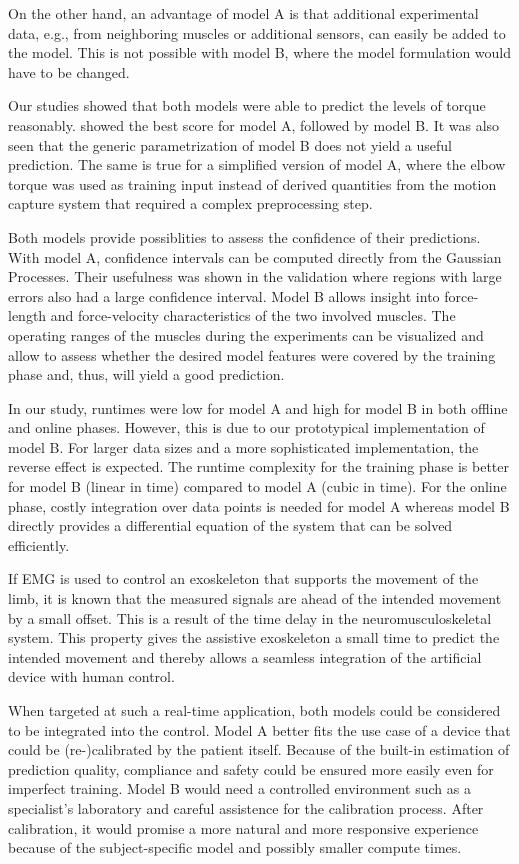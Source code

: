 On the other hand, an advantage of model A is that additional experimental data, e.g., from neighboring muscles or additional sensors, can easily be added to the model. This is not possible with model B, where the model formulation would have to be changed.

Our studies showed that both models were able to predict the levels of torque reasonably. 
 showed the best score for model A, followed by model B. It was also seen that the generic parametrization of model B does not yield a useful prediction. The same is true for a simplified version of model A, where the elbow torque was used as training input instead of derived quantities from the motion capture system that required a complex preprocessing step.

Both models provide possiblities to assess the confidence of their predictions. With model A, confidence intervals can be computed directly from the Gaussian Processes. Their usefulness was shown in the validation where regions with large errors also had a large confidence interval. 
Model B allows insight into force-length and force-velocity characteristics of the two involved muscles. The operating ranges of the muscles during the experiments can be visualized and allow to assess whether the desired model features were covered by the training phase and, thus, will yield a good prediction.

In our study, runtimes were low for model A and high for model B in both offline and online phases. However, this is due to our prototypical implementation of model B. For larger data sizes and a more sophisticated implementation, the reverse effect is expected. The runtime complexity for the training phase is better for model B (linear in time) compared to model A (cubic in time). For the online phase, costly integration over data points is needed for model A whereas model B directly provides a differential equation of the system that can be solved efficiently. 

If EMG is used to control an exoskeleton that supports the movement of the limb, it is known that the measured signals are ahead of the intended movement by a small offset. This is a result of the time delay in the neuromusculoskeletal system. This property gives the assistive exoskeleton a small time to predict the intended movement and thereby allows a seamless integration of the artificial device with human control.

When targeted at such a real-time application, both models could be considered to be integrated into the control. Model A better fits the use case of a device that could be (re\nobreakdash-)calibrated by the patient itself. Because of the built-in estimation of prediction quality, compliance and safety could be ensured more easily even for imperfect training.
Model B would need a controlled environment such as a specialist's laboratory and careful assistence for the calibration process.
After calibration, it would promise a more natural and more responsive experience because of the subject-specific model and possibly smaller compute times.

